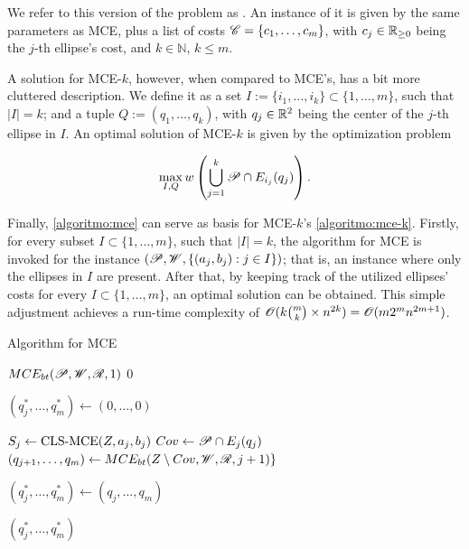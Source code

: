 We refer to this version of the problem as  . An instance of it is given by the same parameters as MCE, plus a list of costs $\mathscr{C}=\{c_1, \dots, c_m\}$, with $c_j\in\mathbb{R}_{\ge0}$ being the $j$-th ellipse's cost, and $k\in\mathbb{N}$, $k\le m$.

 A solution for MCE-$k$, however,  when compared to MCE's, has a bit more cluttered description. We define it as a set $I:=\{i_1, \dots, i_k\}\subset\{1, \dots, m\}$, such that $|I|=k$; and a tuple $Q:=(q_1, \dots, q_k)$, with $q_j\in\mathbb{R}^2$ being the center of the $j$-th ellipse in $I$. An optimal solution of MCE-$k$ is given by the optimization problem

\begin{equation*}
\max_{I, Q} w\left(\bigcup_{j=1}^k \mathscr{P} \cap E_{i_j}(q_j)\right).
\end{equation*}

Finally, \autoref{algoritmo:mce} can serve as basis for MCE-$k$'s \autoref{algoritmo:mce-k}. 
Firstly, for every subset $I \subset \{1, \dots, m\}$, such that $|I| = k$, the algorithm for MCE is invoked for the instance $(\mathscr{P}, \mathscr{W}, \{(a_j, b_j) : j \in I\})$; that is, an instance where only the ellipses in $I$ are present.
After that, by keeping track of the utilized ellipses' costs for every $I \subset \{1, \dots, m\}$, an optimal solution can be obtained.
This simple adjustment achieves a run-time complexity of $\mathscr{O}(k\binom{m}{k} \times n^{2k}) = \mathscr{O}(m2^mn^{2m+1})$. 

\begin{algoritmo}
    \caption{Algorithm for MCE}\label{algoritmo:mce}
    
    \begin{algorithmic}[1]
        
        
        \item[]
	    \State \Return $MCE_{bt}(\mathscr{P}, \mathscr{W}, \mathscr{R}, 1)$
        \EndProcedure
        \State
        \State \Return $0$
        \EndIf
        
        \State $(q_j^*, \dots, q_m^*) \gets (0, \dots, 0)$

        \State $S_j \gets \textnormal{CLS-MCE}(Z, a_j, b_j)$
        \State $Cov \gets \mathscr{P} \cap E_j(q_j)$
        \State $(q_{j+1}, \dots, q_m) \gets MCE_{bt}(Z \setminus Cov, \mathscr{W}, \mathscr{R}, j+1)\}$
        
        \State $(q_j^*, \dots, q_m^*) \gets(q_j, \dots, q_m)$
        \EndIf
        \EndFor

        \State \Return $(q_j^*, \dots, q_m^*)$
        \EndProcedure
    \end{algorithmic}
\end{algoritmo}

